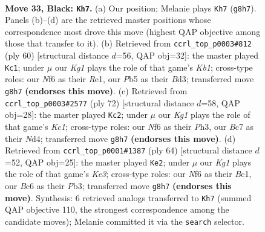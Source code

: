 \documentclass[11pt]{article}
\begin{document}
\clearpage

\begin{figure}[p]\centering
\begin{subfigure}{0.46\textwidth}\centering
\resizebox{\linewidth}{!}{%
\newchessgame
\chessboard[
  setfen={4r1k1/p1b3p1/P1b2n1p/1p3p2/5P2/1P2P1P1/5R2/RNB3K1 b - - 1 33},
  showmover=false,
  pgfstyle=straightmove, color=movearrow, markmove={g8-h7}
]}
\caption{}
\end{subfigure}\hfill
\begin{subfigure}{0.46\textwidth}\centering
\resizebox{\linewidth}{!}{%
\newchessgame
\chessboard[
  setfen={1r4k1/3b1pp1/3b3p/3p3P/1p4P1/3B1P2/1PPB4/1K2R3 w - - 0 31},
  showmover=false,
  pgfstyle=straightmove, color=movearrow, markmove={b1-c1}
]}
\caption{}
\end{subfigure}
\\[4pt]
\begin{subfigure}{0.46\textwidth}\centering
\resizebox{\linewidth}{!}{%
\newchessgame
\chessboard[
  setfen={3k4/1p1b4/r2np2p/2R3p1/p2N2P1/P3PB1P/1P6/2K5 w - - 3 37},
  showmover=false,
  pgfstyle=straightmove, color=movearrow, markmove={c1-c2}
]}
\caption{}
\end{subfigure}\hfill
\begin{subfigure}{0.46\textwidth}\centering
\resizebox{\linewidth}{!}{%
\newchessgame
\chessboard[
  setfen={1n1r4/1b2k2p/p4pp1/P3p3/1pB1P3/1P2KP2/7P/2B3R1 w - - 2 33},
  showmover=false,
  pgfstyle=straightmove, color=movearrow, markmove={e3-e2}
]}
\caption{}
\end{subfigure}
\caption{\textbf{Move 33, Black: \texttt{Kh7}.} (a) Our position; Melanie plays \texttt{Kh7} (\texttt{g8h7}). Panels (b)--(d) are the retrieved master positions whose correspondence most drove this move (highest QAP objective among those that transfer to it). (b) Retrieved from \texttt{ccrl\_top\_p0003\#812} (ply 60) [structural distance $d$=56, QAP obj=32]: the master played \texttt{Kc1}; under $\mu$ our \emph{Kg1} plays the role of that game's \emph{Kb1}; cross-type roles: our \emph{N}f6 as their \emph{R}e1, our \emph{P}b5 as their \emph{B}d3; transferred move \texttt{g8h7} \textbf{(endorses this move)}. (c) Retrieved from \texttt{ccrl\_top\_p0003\#2577} (ply 72) [structural distance $d$=58, QAP obj=28]: the master played \texttt{Kc2}; under $\mu$ our \emph{Kg1} plays the role of that game's \emph{Kc1}; cross-type roles: our \emph{N}f6 as their \emph{P}h3, our \emph{B}c7 as their \emph{N}d4; transferred move \texttt{g8h7} \textbf{(endorses this move)}. (d) Retrieved from \texttt{ccrl\_top\_p0001\#1387} (ply 64) [structural distance $d$=52, QAP obj=25]: the master played \texttt{Ke2}; under $\mu$ our \emph{Kg1} plays the role of that game's \emph{Ke3}; cross-type roles: our \emph{N}f6 as their \emph{B}c1, our \emph{B}c6 as their \emph{P}b3; transferred move \texttt{g8h7} \textbf{(endorses this move)}. Synthesis: 6 retrieved analogs transferred to \texttt{Kh7} (summed QAP objective 110, the strongest correspondence among the candidate moves); Melanie committed it via the \texttt{search} selector.}
\label{fig:thought-m65}
\end{figure}
\end{document}
